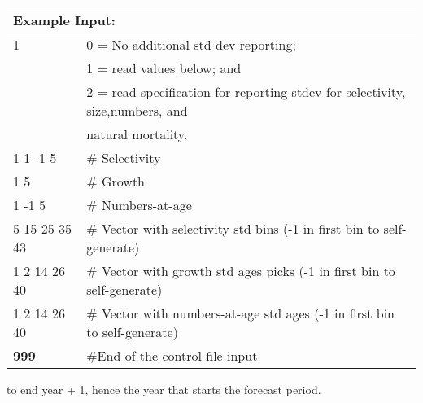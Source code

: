 		
\begin{longtable}{p{1.1cm} p{1.4cm} p{1.2cm} p{1.2cm} p{1.3cm} p{1.6cm} p{1.4cm} p{1.4cm} p{1.4cm}}
	
	\hline
	\multicolumn{9}{l}{Example Input:}\Tstrut\Bstrut\\
	\hline
	
	\multicolumn{3}{l}{1} & \multicolumn{6}{l}{0 = No additional std dev reporting;} \Tstrut\\
	\multicolumn{3}{l}{ } & \multicolumn{6}{l}{1 = read values below; and}\Bstrut\\
	\multicolumn{3}{l}{ } & \multicolumn{6}{l}{2 = read specification for reporting stdev for selectivity, size,numbers, and }\Bstrut\\
	\multicolumn{3}{l}{ } & \multicolumn{6}{l}{natural mortality.}\Bstrut\\
	\hline
	
	\multicolumn{4}{l}{ 1 1 -1 5} & \multicolumn{5}{l}{\# Selectivity} \Bstrut\\
	\multicolumn{4}{l}{ 1 5}      & \multicolumn{5}{l}{\# Growth} \Bstrut\\
	\multicolumn{4}{l}{1 -1 5}    & \multicolumn{5}{l}{\# Numbers-at-age} \Bstrut\\

	\multicolumn{4}{l}{5 15 25 35 43} & \multicolumn{5}{l}{\# Vector with selectivity std bins (-1 in first bin to self-generate)}\Bstrut\\
	\multicolumn{4}{l}{1 2 14 26 40}  & \multicolumn{5}{l}{\# Vector with growth std ages picks (-1 in first bin to self-generate)}\Bstrut\\
	\multicolumn{4}{l}{1 2 14 26 40}  & \multicolumn{5}{l}{\# Vector with numbers-at-age std ages (-1 in first bin to self-generate)}\Bstrut\\
	
	\hline
	\bfseries{999} & \multicolumn{8}{l}{\#End of the control file input}\Tstrut\Bstrut\\
	\hline			
\end{longtable}

to end year + 1, hence the year that starts the forecast period.
